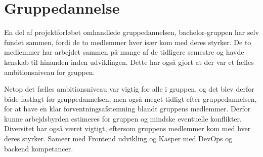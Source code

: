 \chapter{Gruppedannelse}

En del af projektforløbet omhandlede gruppedannelsen, bachelor-gruppen har selv fundet sammen, fordi de to medlemmer hver især kom med deres styrker. De to medlemmer har arbejdet sammen på mange af de tidligere semestre og havde kenskab til hinanden inden udviklingen. Dette har også gjort at der var et fælles ambitionsniveau for gruppen.

Netop det fælles ambitionsniveau var vigtig for alle i gruppen, og det blev derfor både fastlagt før gruppedannelsen, men også meget tidligt efter gruppedannelsen, for at have en klar forventningsafstemning blandt gruppens medlemmer. Derfor kunne arbejdsbyrden estimeres for gruppen og mindske eventuelle konflikter. Diversitet har også været vigtigt, eftersom gruppens medlemmer kom med hver deres styrker. Sameer med Frontend udvikling og Kasper med DevOps og backend kompetancer.